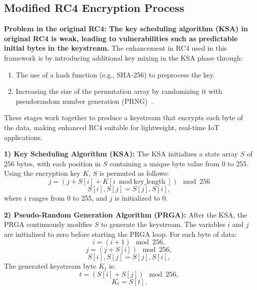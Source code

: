 \documentclass[runningheads]{llncs}
\begin{document}
\subsection{Modified RC4 Encryption Process}

\textbf{Problem in the original RC4: The key scheduling algorithm (KSA) in original RC4 is weak, leading to vulnerabilities such as predictable initial bytes in the keystream.}  
The enhancement in RC4 used in this framework is by introducing additional key mixing in the KSA phase through:
\begin{enumerate}
    \item The use of a hash function (e.g., SHA-256) to preprocess the key.
    \item Increasing the size of the permutation array by randomizing it with pseudorandom number generation (PRNG)~\cite{ref2,ref9}.
\end{enumerate}
These stages work together to produce a keystream that encrypts each byte of the data, making enhanced RC4 suitable for lightweight, real-time IoT applications.

\textbf{1) Key Scheduling Algorithm (KSA):} The KSA initializes a state array \( S \) of 256 bytes, with each position in \( S \) containing a unique byte value from 0 to 255. Using the encryption key \( K \), \( S \) is permuted as follows:
\[
j = (j + S[i] + K[i \bmod \text{key\_length}]) \mod 256
\]
\begin{equation}
S[i], S[j] = S[j], S[i],
\end{equation}
where \( i \) ranges from 0 to 255, and \( j \) is initialized to 0.

\textbf{2) Pseudo-Random Generation Algorithm (PRGA):} After the KSA, the PRGA continuously modifies \( S \) to generate the keystream. The variables \( i \) and \( j \) are initialized to zero before starting the PRGA loop. For each byte of data:
\begin{equation}
i = (i + 1) \mod 256,
\end{equation}
\begin{equation}
j = (j + S[i]) \mod 256,
\end{equation}
\begin{equation}
S[i], S[j] = S[j], S[i],
\end{equation}
The generated keystream byte \( K_t \) is:
\begin{equation}
t = (S[i] + S[j]) \mod 256,
\end{equation}
\begin{equation}
K_t = S[t].
\end{equation}
\end{document}
